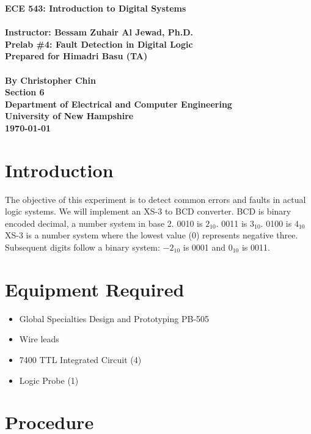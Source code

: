 \documentclass[11pt,a4paper]{article}
\begin{document}
\begin{center}
\textbf{
    \Large{ECE 543: Introduction to Digital Systems}
    \\~\\
    \large{Instructor: Bessam Zuhair Al Jewad, Ph.D.}
    \\[1.25in]
    \LARGE{Prelab \#4: Fault Detection in Digital Logic}
    \\[0.62in]
    \large{Prepared for Himadri Basu (TA)\\~\\By Christopher Chin}
    \\[1.25in]
    \LARGE{Section 6}
    \\[1.25in]
    \Large{Department of Electrical and Computer Engineering\\
           University of New Hampshire}
    \\[1.25in]
    \Large{\today}
}
\end{center}
\clearpage
{}

\tableofcontents
\pagebreak

\section{Introduction}
The objective of this experiment is to detect common errors and faults in actual logic systems.
We will implement an XS-3 to BCD converter.
BCD is binary encoded decimal, a number system in base 2.
0010 is $2_10$. 0011 is $3_10$. 0100 is $4_10$
XS-3 is a number system where the lowest value (0) represents negative three.
Subsequent digits follow a binary system: $-2_10$ is 0001 and $0_10$ is 0011.

\section{Equipment Required}
\begin{itemize}
    \item Global Specialties Design and Prototyping PB-505
    \item Wire leads
    \item 7400 TTL Integrated Circuit (4)
    \item Logic Probe (1)
\end{itemize}
\section{Procedure}
\end{document}
